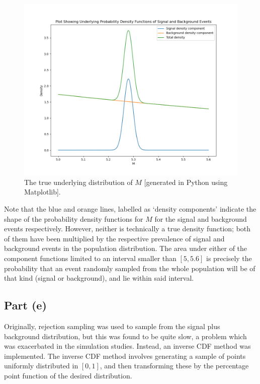 \documentclass[12pt]{article}
\begin{document}
\begin{figure}[hbt]
    \includegraphics[scale=0.5]{part_d_plot.png}
    \caption{The true underlying distribution of $M$ [generated in Python using Matplotlib].}
    \label{part_d_plot}
\end{figure}

Note that the blue and orange lines, labelled as `density components' indicate the shape of the probability density functions for $M$ for the signal and background events respectively.
However, neither is technically a true density function; both of them have been multiplied by the respective prevalence of signal and background events in the population distribution.
The area under either of the component functions limited to an interval smaller than $[5, 5.6]$ is precisely the probability that an event randomly sampled from the whole population will be of that kind (signal or background), and lie within said interval.

\subsection*{Part (e)}

Originally, rejection sampling was used to sample from the signal plus background distribution, but this was found to be quite slow, a problem which was exacerbated in the simulation studies.
Instead, an inverse CDF method was implemented.
The inverse CDF method involves generating a sample of points uniformly distributed in $[0, 1]$, and then transforming these by the percentage point function of the desired distribution.
\end{document}
